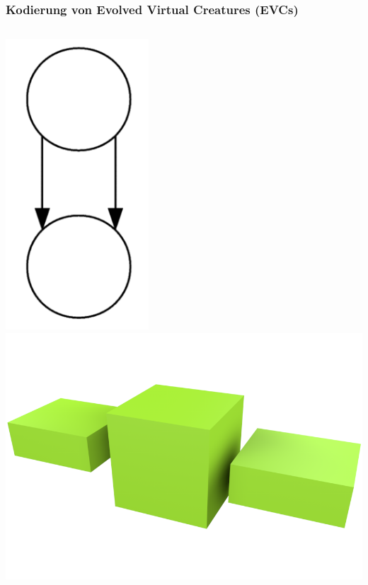 \documentclass{beamer}
\begin{document}
\begin{frame}
	\frametitle{Kodierung von Evolved Virtual Creatures (EVCs)}
	\begin{columns}[c]
		\centering
		\includegraphics[width=0.4\textwidth]{img/g1a.png}
		\centering
		\includegraphics[width=\textwidth]{img/1.png}
	\end{columns}
\end{frame}
\end{document}
